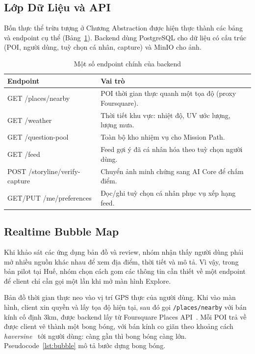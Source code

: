 \subsection{Lớp Dữ Liệu và API}
\contrib

Bốn thực thể trừu tượng ở Chương Abstraction được hiện thực thành các
bảng và endpoint cụ thể (Bảng~\ref{tab:impl_endpoints}). Backend dùng
PostgreSQL cho dữ liệu có cấu trúc (POI, người dùng, tuỳ chọn cá nhân,
capture) và MinIO cho ảnh.

\begin{table}[H]
\centering
\caption{Một số endpoint chính của backend}
\label{tab:impl_endpoints}
\begin{tabularx}{\textwidth}{>{\ttfamily\small\raggedright\arraybackslash}p{4.7cm} X}
\toprule
\textbf{\normalfont Endpoint} & \textbf{Vai trò} \\
\midrule
GET /places/nearby & POI thời gian thực quanh một tọa độ (proxy Foursquare). \\
GET /weather & Thời tiết khu vực: nhiệt độ, UV ước lượng, lượng mưa. \\
GET /question-pool & Toàn bộ kho nhiệm vụ cho Mission Path. \\
GET /feed & Feed gợi ý đã cá nhân hóa theo tuỳ chọn người dùng. \\
POST /storyline/verify-capture & Chuyển ảnh minh chứng sang AI Core để chấm điểm. \\
GET/PUT /me/preferences & Đọc/ghi tuỳ chọn cá nhân phục vụ xếp hạng feed. \\
\bottomrule
\end{tabularx}
\end{table}

\subsection{Realtime Bubble Map}
\contrib

Khi khảo sát các ứng dụng bản đồ và review, nhóm nhận thấy người dùng
phải mở nhiều nguồn khác nhau để xem địa điểm, thời tiết và mô tả. Vì
vậy, trong bản pilot tại Huế, nhóm chọn cách gom các thông tin cần thiết
về một endpoint để client chỉ cần gọi một lần khi mở màn hình Explore.

Bản đồ thời gian thực neo vào vị trí GPS thực của người dùng. Khi vào màn
hình, client xin quyền và lấy tọa độ hiện tại, sau đó gọi
\texttt{/places/nearby} với bán kính cố định 3km, được backend lấy từ
Foursquare Places API~\cite{foursquare_places}. Mỗi POI trả về được
client vẽ thành một bong bóng, với bán kính co giãn theo khoảng cách
\textit{haversine}~\cite{sinnott1984} tới người dùng: càng gần thì bong
bóng càng lớn. Pseudocode~\ref{lst:bubble} mô tả bước dựng bong bóng.

